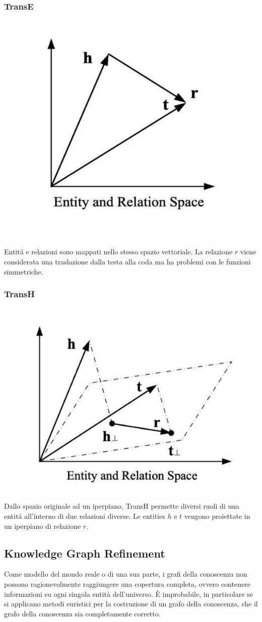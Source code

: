 \newpage
\subsubsection*{TransE}
\begin{figure}[th]
    \centering
    \includegraphics[width=0.4\linewidth]{KnowledgeGraphs//img/transE.png}
\end{figure}
Entitá e relazioni sono mappati nello stesso spazio vettoriale. La relazione $r$ viene considerata una traslazione dalla testa alla coda ma ha problemi con le funzioni simmetriche.
\subsubsection*{TransH}
\begin{figure}[th]
    \centering
    \includegraphics[width=0.4\linewidth]{KnowledgeGraphs//img/transH.png}
\end{figure}
Dallo spazio originale ad un iperpiano, TransH permette diversi ruoli di una entitá all'interno di due relazioni diverse. Le entities $h$ e $t$ vengono proiettate in un iperpiano di relazione $r$. 

\subsection{Knowledge Graph Refinement}
Come modello del mondo reale o di una sua parte, i grafi della conoscenza non possono ragionevolmente raggiungere una copertura completa, ovvero contenere informazioni su ogni singola entità dell'universo. È improbabile, in particolare se si applicano metodi euristici per la costruzione di un grafo della conoscenza, che il grafo della conoscenza sia completamente corretto.
